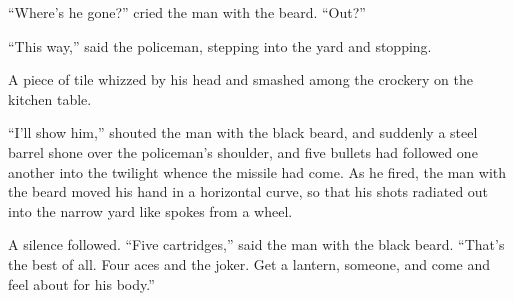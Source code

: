 “Where’s he gone?” cried the man with the beard. “Out?”

“This way,” said the policeman, stepping into the yard and stopping.

A piece of tile whizzed by his head and smashed among the crockery on the kitchen table.

“I’ll show him,” shouted the man with the black beard, and suddenly a steel barrel shone over the policeman’s shoulder, and five bullets had followed one another into the twilight whence the missile had come. As he fired, the man with the beard moved his hand in a horizontal curve, so that his shots radiated out into the narrow yard like spokes from a wheel.

A silence followed. “Five cartridges,” said the man with the black beard. “That’s the best of all. Four aces and the joker. Get a lantern, someone, and come and feel about for his body.”